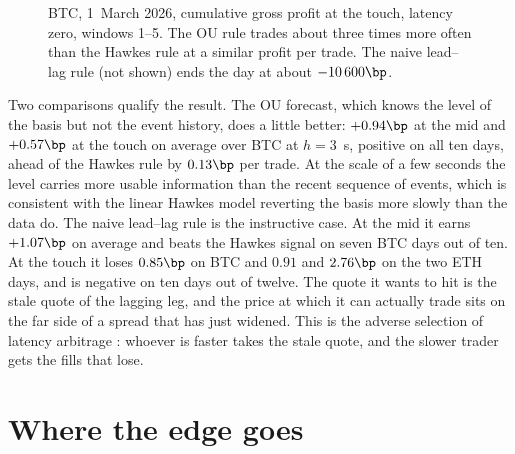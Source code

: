 \documentclass[a4paper,11pt]{article}
\begin{document}
\begin{figure}[!htb]
\centering
{}
\caption{BTC, 1~March 2026, cumulative gross profit at the touch, latency zero, windows 1--5. The OU rule trades about three times more often than the Hawkes rule at a similar profit per trade. The naive lead--lag rule (not shown) ends the day at about $-10\,600\bp$.}
\label{fig:cumpnl}
\end{figure}

Two comparisons qualify the result. The OU forecast, which knows the level of the basis but not the event history, does a little better: $+0.94\bp$ at the mid and $+0.57\bp$ at the touch on average over BTC at $h = 3$~s, positive on all ten days, ahead of the Hawkes rule by $0.13\bp$ per trade. At the scale of a few seconds the level carries more usable information than the recent sequence of events, which is consistent with the linear Hawkes model reverting the basis more slowly than the data do. The naive lead--lag rule is the instructive case. At the mid it earns $+1.07\bp$ on average and beats the Hawkes signal on seven BTC days out of ten. At the touch it loses $0.85\bp$ on BTC and $0.91$ and $2.76\bp$ on the two ETH days, and is negative on ten days out of twelve. The quote it wants to hit is the stale quote of the lagging leg, and the price at which it can actually trade sits on the far side of a spread that has just widened. This is the adverse selection of latency arbitrage \cite{budish2015, albers2025}: whoever is faster takes the stale quote, and the slower trader gets the fills that lose.

\section{Where the edge goes}
\end{document}
